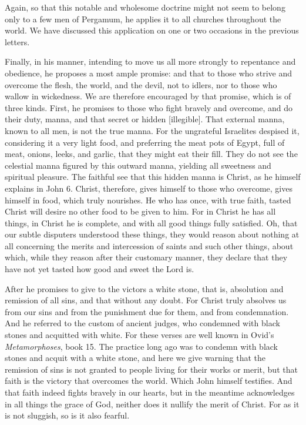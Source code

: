 Again, so that this notable and wholesome doctrine might not seem to belong only to a few men of Pergamum, he applies it to all churches throughout the world. We have discussed this application on one or two occasions in the previous letters.

Finally, in his manner, intending to move us all more strongly to repentance and obedience, he proposes a most ample promise: and that to those who strive and overcome the flesh, the world, and the devil, not to idlers, nor to those who wallow in wickedness. We are therefore encouraged by that promise, which is of three kinds. First, he promises to those who fight bravely and overcome, and do their duty, manna, and that secret or hidden [illegible]. That external manna, known to all men, is not the true manna. For the ungrateful Israelites despised it, considering it a very light food, and preferring the meat pots of Egypt, full of meat, onions, leeks, and garlic, that they might eat their fill. They do not see the celestial manna figured by this outward manna, yielding all sweetness and spiritual pleasure. The faithful see that this hidden manna is Christ, as he himself explains in John 6. Christ, therefore, gives himself to those who overcome, gives himself in food, which truly nourishes. He who has once, with true faith, tasted Christ will desire no other food to be given to him. For in Christ he has all things, in Christ he is complete, and with all good things fully satisfied. Oh, that our subtle disputers understood these things, they would reason about nothing at all concerning the merits and intercession of saints and such other things, about which, while they reason after their customary manner, they declare that they have not yet tasted how good and sweet the Lord is.

After he promises to give to the victors a white stone, that is, absolution and remission of all sins, and that without any doubt. For Christ truly absolves us from our sins and from the punishment due for them, and from condemnation. And he referred to the custom of ancient judges, who condemned with black stones and acquitted with white. For these verses are well known in Ovid’s \textit{Metamorphoses}, book 15. The practice long ago was to condemn with black stones and acquit with a white stone, and here we give warning that the remission of sins is not granted to people living for their works or merit, but that faith is the victory that overcomes the world. Which John himself testifies. And that faith indeed fights bravely in our hearts, but in the meantime acknowledges in all things the grace of God, neither does it nullify the merit of Christ. For as it is not sluggish, so is it also fearful.

